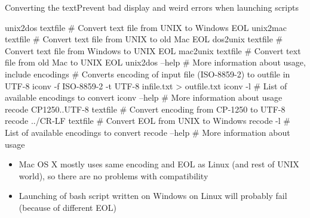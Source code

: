 \documentclass[compress, ucs, xelatex, 11pt, xcolor=svgnames,
  hyperref={
    bookmarks=true,
    unicode=true,
    colorlinks=true,
    pdftitle={Linux, command line and MetaCentrum},
    plainpages=false,
    pdfauthor={Vojtech Zeisek},
    pdfsubject={Course about use of Linux command line, writing shell scripts and using MetaCentrum of CESNET},
    pdfcreator={XeLaTeX},
    pdfkeywords={Linux, GNU, BASH, shell, command line, MetaCentrum},
    linkcolor=Red,
    anchorcolor=Blue,
    citecolor=Purple,
    filecolor=DodgerBlue,
    menucolor=DarkOrchid,
    urlcolor=DeepSkyBlue,
    pdftex},
  url={hyphens, lowtilde} %
  ]{beamer}
\begin{document}
\begin{frame}[fragile]{Converting the text}{Prevent bad display and weird errors when launching scripts}
  \begin{bashcode}
    unix2dos textfile # Convert text file from UNIX to Windows EOL
    unix2mac textfile # Convert text file from UNIX to old Mac EOL
    dos2unix textfile # Convert text file from Windows to UNIX EOL
    mac2unix textfile # Convert text file from old Mac to UNIX EOL
    unix2dos --help # More information about usage, include encodings
    # Converts encoding of input file (ISO-8859-2) to outfile in UTF-8
    iconv -f ISO-8859-2 -t UTF-8 infile.txt > outfile.txt
    iconv -l # List of available encodings to convert
    iconv --help # More information about usage
    recode CP1250..UTF-8 textfile # Convert encoding from CP-1250 to UTF-8
    recode ../CR-LF textfile # Convert EOL from UNIX to Windows
    recode -l # List of available encodings to convert
    recode --help # More information about usage
  \end{bashcode}
  \begin{itemize}
    \item Mac OS X mostly uses same encoding and EOL as Linux (and rest of UNIX world), so there are no problems with compatibility
    \item Launching of bash script written on Windows on Linux will probably fail (because of different EOL)
  \end{itemize}
\end{frame}
\end{document}
